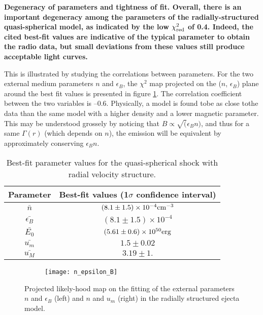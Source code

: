 \bf{Degeneracy of parameters and tightness of fit. }Overall, there is an important degeneracy among the parameters of the radially-structured quasi-spherical model, as indicated by the low $\chi^2_{\rm{red}}$ of 0.4. Indeed, the cited best-fit values are indicative of the typical parameter to obtain the radio data, but small deviations from these values still produce acceptable light curves.

This is illustrated by studying the correlations between parameters. For the two external medium parameters $n$ and $\epsilon_B$, the $\chi^2$ map projected on the ($n$, $\epsilon_B$) plane around the best fit values is presented in figure \ref{n_epsilon_B}. The correlation coefficient between the two variables is --0.6. Physically, a model is found tobe as close tothe data than the same model with a higher density and a lower magnetic parameter. This may be understood grossely by noticing that $B \propto \sqrt(\epsilon_B n)$, and thus for a same $\Gamma(r)$ (which depends on $n$), the emission will be equivalent by approximately conserving $\epsilon_B n$.

\begin{table}
\begin{center}
\begin{tabular}{c|c}
\bf{Parameter} & \bf{Best-fit values (1$\sigma$ confidence interval)}\\
\hline
$\bar{n}$ & $(8.1\pm1.5) \times 10^{-4} \rm{cm}^{-3}$ \\
$\bar{\epsilon_B}$ & $(8.1\pm1.5) \times 10^{-4} $ \\
$\bar{E_0}$ & $(5.61\pm0.6) \times 10^{50} \rm{erg}$ \\
$\bar{u_m}$ & $1.5\pm0.02$ \\
$\bar{u_M}$ & $3.19\pm1.$ \\
\end{tabular}
\end{center}
\caption{Best-fit parameter values for the quasi-spherical shock with radial velocity structure.}
\label{cocoon}
\end{table}

\begin{figure}
\centering
\begin{subfigure}
    \centering
    \texttt{[image: n\_epsilon\_B]}
\end{subfigure}%
\begin{subfigure}
    \texttt{[image: umn]}
\end{subfigure}
\caption{Projected likely-hood map on the fitting of the external parameters $n$ and $\epsilon_B$ (left) and $n$ and $u_m$ (right) in the radially structured ejecta model.}
\label{n_epsilon_B}
\end{figure}


